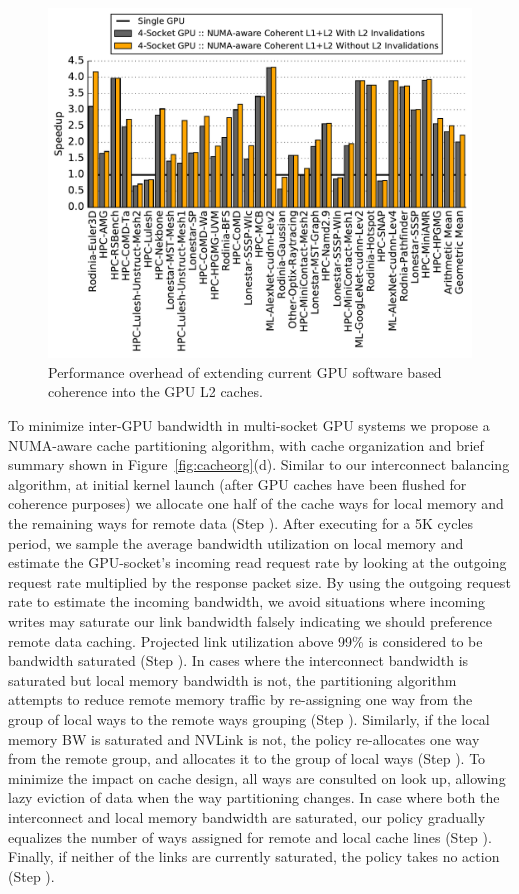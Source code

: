\begin{figure}[t]
    \centering
    \includegraphics[width=1.0\columnwidth]{figures/plot_no_inval_WB.pdf}
    \caption{Performance overhead of extending current GPU software based coherence
    into the GPU L2 caches.}
    \label{fig:invalidations}
    \vspace{-.2in}
\end{figure}


To minimize inter-GPU bandwidth in multi-socket GPU systems we propose a
NUMA-aware cache partitioning algorithm, with cache organization and brief summary 
shown in Figure~\ref{fig:cacheorg}(d).  Similar to our interconnect balancing
algorithm, at initial kernel launch (after GPU caches have been flushed for
coherence purposes) we allocate one half of the cache ways for local memory and 
the remaining ways for remote data (Step ). After executing for a 5K cycles 
period, we sample the average bandwidth utilization on local memory and estimate
the GPU-socket's incoming read request rate by looking at the outgoing request rate
multiplied by the response packet size.  By using the outgoing request rate to estimate
the incoming bandwidth, we avoid situations where incoming writes may saturate
our link bandwidth falsely indicating we should preference remote data caching.
Projected link utilization above 99\% is considered to be bandwidth saturated 
(Step ). In cases where the interconnect bandwidth is saturated but
local memory bandwidth is not, the partitioning algorithm attempts to reduce remote 
memory traffic by re-assigning one way from the group of local ways to the
remote ways grouping (Step ).
Similarly, if the local memory BW is saturated and NVLink is not, the policy 
re-allocates one way from the remote group, and allocates it to the group of local ways (Step 
).  To minimize the impact on cache design, all ways are consulted on look
up, allowing lazy eviction of data when the way partitioning changes.
In case where both the interconnect and local memory bandwidth 
are saturated, our policy gradually equalizes the number of ways assigned for remote 
and local cache lines (Step ). Finally, if neither of the links are 
currently saturated, the policy takes no action (Step ).

